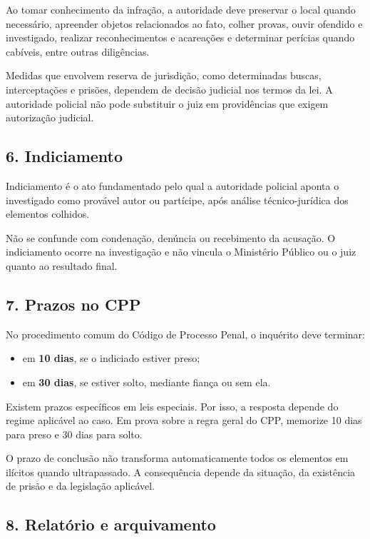 \documentclass[11pt,a4paper]{article}
\begin{document}
Ao tomar conhecimento da infração, a autoridade deve preservar o local quando necessário, apreender objetos relacionados ao fato, colher provas, ouvir ofendido e investigado, realizar reconhecimentos e acareações e determinar perícias quando cabíveis, entre outras diligências.

Medidas que envolvem reserva de jurisdição, como determinadas buscas, interceptações e prisões, dependem de decisão judicial nos termos da lei. A autoridade policial não pode substituir o juiz em providências que exigem autorização judicial.

\subsection*{6. Indiciamento}

Indiciamento é o ato fundamentado pelo qual a autoridade policial aponta o investigado como provável autor ou partícipe, após análise técnico-jurídica dos elementos colhidos.

Não se confunde com condenação, denúncia ou recebimento da acusação. O indiciamento ocorre na investigação e não vincula o Ministério Público ou o juiz quanto ao resultado final.

\subsection*{7. Prazos no CPP}

No procedimento comum do Código de Processo Penal, o inquérito deve terminar:

\begin{itemize}
  \item em \textbf{10 dias}, se o indiciado estiver preso;
  \item em \textbf{30 dias}, se estiver solto, mediante fiança ou sem ela.
\end{itemize}

Existem prazos específicos em leis especiais. Por isso, a resposta depende do regime aplicável ao caso. Em prova sobre a regra geral do CPP, memorize 10 dias para preso e 30 dias para solto.

O prazo de conclusão não transforma automaticamente todos os elementos em ilícitos quando ultrapassado. A consequência depende da situação, da existência de prisão e da legislação aplicável.

\subsection*{8. Relatório e arquivamento}
\end{document}
